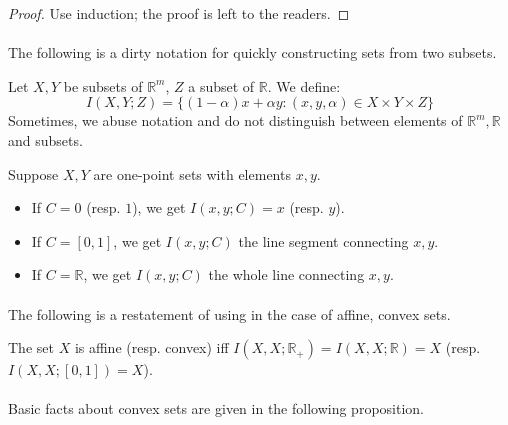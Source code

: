 \begin{proof}
	Use induction; the proof is left to the readers.
\end{proof}

\paragraph{}The following is a dirty notation for quickly constructing sets from two subsets.

\begin{defn}[$I(X,Y;Z)$]\label{defn:011-I}
	Let $X,Y$ be subsets of $\mathbb{R}^m$, $Z$ a subset of $\mathbb{R}$. We define:
	\[
		I(X,Y;Z)=\{(1-\alpha)x+\alpha y:(x,y,\alpha)\in X\times Y\times Z\}
	\]
	Sometimes, we abuse notation and do not distinguish between elements of $\mathbb{R}^m,\mathbb{R}$ and subsets.
\end{defn}

\begin{exmp}\label{defn:011-I-exmpl}
	Suppose $X,Y$ are one-point sets with elements $x, y$.
	\begin{itemize}
		\item If $C=0$ (resp. $1$), we get $I(x,y;C)=x$ (resp. $y$).
		\item If $C=[0,1]$, we get $I(x,y;C)$ the line segment connecting $x, y$.
		\item If $C=\mathbb{R}$, we get $I(x,y;C)$ the whole line connecting $x, y$.
	\end{itemize}
\end{exmp}

\paragraph{}The following is a restatement of  using  in the case of affine, convex sets.

\begin{prop}The set $X$ is affine (resp. convex) iff $I(X,X;\mathbb{R}_{+})=I(X,X;\mathbb{R})=X$ (resp. $I(X,X;[0,1])=X$).
\end{prop}

\paragraph{}Basic facts about convex sets are given in the following proposition.


